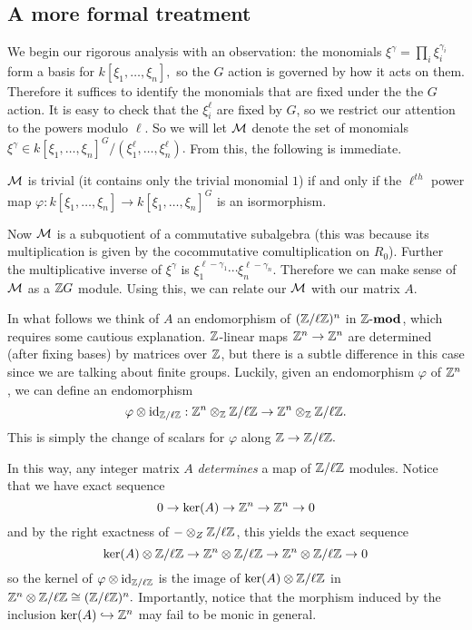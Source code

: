 \documentclass [11pt, proquest] {uwthesis}[2020/02/24]
\begin{document}
{\subsection{A more formal treatment}
    We begin our rigorous analysis with an observation: the monomials $\xi^\gamma=\prod_i \xi_i^{\gamma_i}$ form a basis for $k[\xi_1,\dots,\xi_n],$ so the $G$ action is governed by how it acts on them. Therefore it suffices to identify the monomials that are fixed under the the $G$ action. It is easy to check that the $\xi_i^\ell$ are fixed by $G$, so we restrict our attention to the powers modulo $\ell$. So we will let $\mathcal{M}$ denote the set of monomials $\xi^\gamma\in k[\xi_1,\dots,\xi_n]^G/(\xi_1^\ell,\dots,\xi_n^\ell).$ From this, the following is immediate.
    \begin{lem}
        $\mathcal{M}$ is trivial (it contains only the trivial monomial $1$) if and only if the $\ell^{th}$ power map $\varphi:k[\xi_1,\dots,\xi_n]\to k[\xi_1,\dots,\xi_n]^G$ is an isormorphism.
    \end{lem}
    
    Now $\mathcal{M}$ is a subquotient of a commutative subalgebra (this was because its multiplication is given by the cocommutative comultiplication on $R_0$). Further the multiplicative inverse of $\xi^\gamma$ is $\xi_1^{\ell-\gamma_1}\cdots\xi_n^{\ell-\gamma_n}.$ Therefore we can make sense of $\mathcal{M}$ as a $\mathbb{Z} G$ module. Using this, we can relate our $\mathcal{M}$ with our matrix $A$.
    
    \begin{rmk}\label{rmk:mod-ell}
        In what follows we think of $A$ an endomorphism of $(\mathbb{Z}/\ell\mathbb{Z})^n$ in $\mathbb{Z}\text{-}\mathbf{mod}$, which requires some cautious explanation. $\mathbb{Z}$-linear maps $\mathbb{Z}^n\to \mathbb{Z}^n$ are determined (after fixing bases) by matrices over $\mathbb{Z}$, but there is a subtle difference in this case since we are talking about finite groups. Luckily, given an endomorphism $\varphi$ of $\mathbb{Z}^n$, we can define an endomorphism
        \[\varphi\otimes\operatorname{id}_{\mathbb{Z}/\ell\mathbb{Z}}:\mathbb{Z}^n\otimes_{\mathbb{Z}}\mathbb{Z}/\ell\mathbb{Z}\to \mathbb{Z}^n\otimes_{\mathbb{Z}}\mathbb{Z}/\ell\mathbb{Z}.\]
        This is simply the change of scalars for $\varphi$ along $\mathbb{Z}\to \mathbb{Z}/\ell\mathbb{Z}.$
        
        In this way, any integer matrix $A$ \textit{determines} a map of $\mathbb{Z}/\ell\mathbb{Z}$ modules. Notice that we have exact sequence
        \[0\to\ker(A)\to \mathbb{Z}^n\to \mathbb{Z}^n\to 0\]
        and by the right exactness of $-\otimes_Z \mathbb{Z}/\ell\mathbb{Z}$, this yields the exact sequence
        \[\ker(A)\otimes \mathbb{Z}/\ell\mathbb{Z}\to \mathbb{Z}^n\otimes \mathbb{Z}/\ell\mathbb{Z}\to \mathbb{Z}^n\otimes \mathbb{Z}/\ell\mathbb{Z}\to 0\]
        so the kernel of $\varphi\otimes\operatorname{id}_{\mathbb{Z}/\ell\mathbb{Z}}$ is the image of $\ker(A)\otimes\mathbb{Z}/\ell\mathbb{Z}$ in $\mathbb{Z}^n\otimes\mathbb{Z}/\ell\mathbb{Z}\cong(\mathbb{Z}/\ell\mathbb{Z})^n.$ Importantly, notice that the morphism induced by the inclusion $\ker(A)\hookrightarrow\mathbb{Z}^n$ may fail to be monic in general.
        

\end{rmk}}
\end{document}

